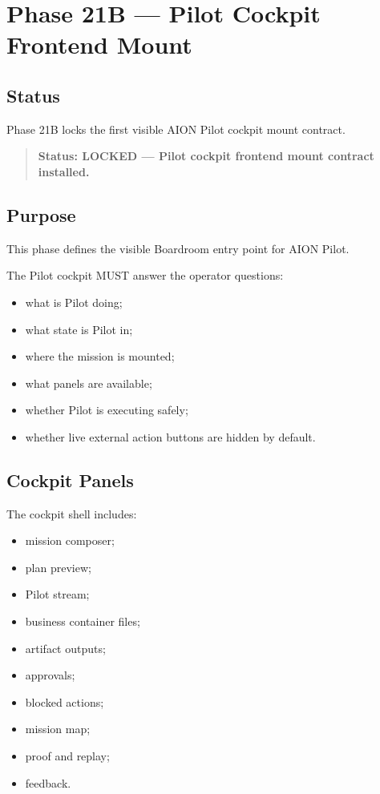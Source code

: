 \section{Phase 21B --- Pilot Cockpit Frontend Mount}
\label{sec:aion-phase21b-pilot-cockpit-frontend-mount}

\subsection{Status}

Phase 21B locks the first visible AION Pilot cockpit mount contract.

\begin{quote}
\textbf{Status: LOCKED --- Pilot cockpit frontend mount contract installed.}
\end{quote}

\subsection{Purpose}

This phase defines the visible Boardroom entry point for AION Pilot.

The Pilot cockpit MUST answer the operator questions:

\begin{itemize}
  \item what is Pilot doing;
  \item what state is Pilot in;
  \item where the mission is mounted;
  \item what panels are available;
  \item whether Pilot is executing safely;
  \item whether live external action buttons are hidden by default.
\end{itemize}

\subsection{Cockpit Panels}

The cockpit shell includes:

\begin{itemize}
  \item mission composer;
  \item plan preview;
  \item Pilot stream;
  \item business container files;
  \item artifact outputs;
  \item approvals;
  \item blocked actions;
  \item mission map;
  \item proof and replay;
  \item feedback.
\end{itemize}

